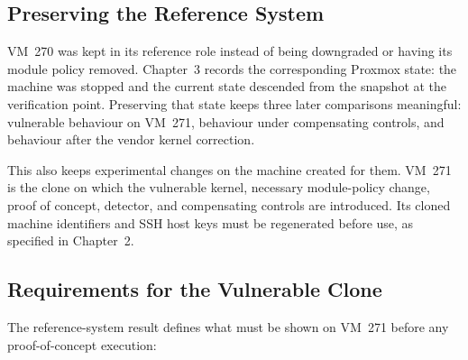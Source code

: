 \subsection{Preserving the Reference System}

VM~270 was kept in its reference role instead of being downgraded or having its
module policy removed. Chapter~3 records the corresponding Proxmox state: the
machine was stopped and the current state descended from the
 snapshot at the verification point. Preserving that
state keeps three later comparisons meaningful: vulnerable behaviour on
VM~271, behaviour under compensating controls, and behaviour after the vendor
kernel correction.

This also keeps experimental changes on the machine created for them. VM~271
 is the clone on which the vulnerable kernel, necessary
module-policy change, proof of concept, detector, and compensating controls are
introduced. Its cloned machine identifiers and SSH host keys must be regenerated
before use, as specified in Chapter~2.

\subsection{Requirements for the Vulnerable Clone}

The reference-system result defines what must be shown on VM~271 before any
proof-of-concept execution:

